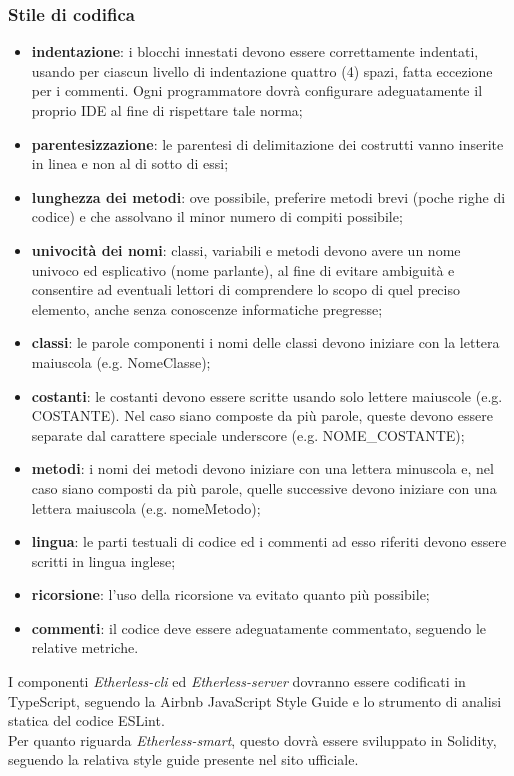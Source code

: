     	\subsubsection*{Stile di codifica}
   \begin{itemize}
         \item{\textbf{indentazione}: i blocchi innestati devono essere correttamente indentati, usando per ciascun livello di indentazione quattro (4) spazi, fatta eccezione per i commenti. Ogni programmatore dovrà configurare adeguatamente il proprio IDE al fine di rispettare tale norma;}
		\item{\textbf{parentesizzazione}: le parentesi di delimitazione dei costrutti vanno inserite in linea e non al di sotto di essi;}
		\item{\textbf{lunghezza dei metodi}: ove possibile, preferire metodi brevi (poche righe di codice) e che assolvano il minor numero di compiti possibile;}
		\item{\textbf{univocità dei nomi}: classi, variabili e metodi devono avere un nome univoco ed esplicativo (nome parlante), al fine di evitare ambiguità e consentire ad eventuali lettori di comprendere lo scopo di quel preciso elemento, anche senza conoscenze informatiche pregresse;}
		\item{\textbf{classi}: le parole componenti i nomi delle classi devono iniziare con la lettera maiuscola (e.g. NomeClasse);}
		\item{\textbf{costanti}: le costanti devono essere scritte usando solo lettere maiuscole (e.g. COSTANTE). Nel caso siano composte da più parole, queste devono essere separate dal carattere speciale underscore (e.g. NOME\_COSTANTE);}
		\item{\textbf{metodi}: i nomi dei metodi devono iniziare con una lettera minuscola e, nel caso 	siano composti da più parole, quelle successive devono iniziare con una lettera maiuscola (e.g. nomeMetodo);}
		\item{\textbf{lingua}: le parti testuali di codice ed i commenti ad esso riferiti devono essere scritti in lingua inglese;}
        \item{\textbf{ricorsione}: l'uso della ricorsione va evitato quanto più possibile;}
        \item{\textbf{commenti}: il codice deve essere adeguatamente commentato, seguendo le relative metriche.}
	\end{itemize}

	\noindent I componenti \textit{Etherless-cli} ed \textit{Etherless-server} dovranno essere codificati in TypeScript, seguendo la Airbnb JavaScript Style Guide e lo strumento di analisi statica del codice ESLint. \\
	Per quanto riguarda \textit{Etherless-smart}, questo dovrà essere sviluppato in Solidity, seguendo la relativa style guide presente nel sito ufficiale.

